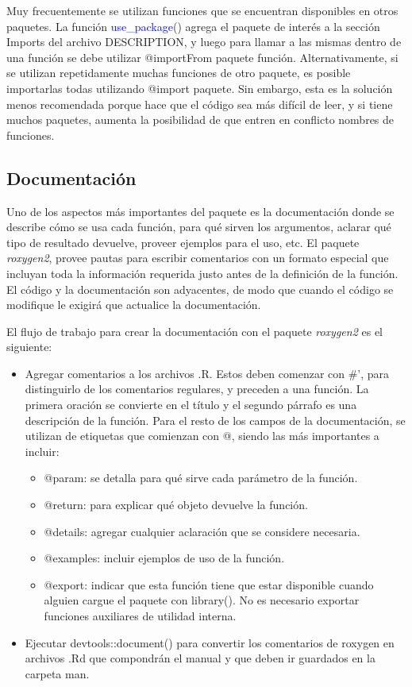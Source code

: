 Muy frecuentemente se utilizan funciones que se encuentran disponibles en otros paquetes. La función \textcolor{blue}{use\_package}() agrega el paquete de interés a la sección Imports del archivo DESCRIPTION, y luego para llamar a las mismas dentro de una función se debe utilizar @importFrom paquete función. Alternativamente, si se utilizan repetidamente muchas funciones de otro paquete, es posible importarlas todas utilizando @import paquete. Sin embargo, esta es la solución menos recomendada porque hace que el código sea más difícil de leer, y si tiene muchos paquetes, aumenta la posibilidad de que entren en conflicto nombres de funciones.


\subsection{Documentación}

Uno de los aspectos más importantes del paquete es la documentación donde se describe cómo se usa cada función, para qué sirven los argumentos, aclarar qué tipo de resultado devuelve, proveer ejemplos para el uso, etc. El paquete \emph{roxygen2}, provee pautas para escribir comentarios con un formato especial que incluyan toda la información requerida justo antes de la definición de la función. El código y la documentación son adyacentes, de modo que cuando el código se modifique le exigirá que actualice la documentación. 

El flujo de trabajo para crear la documentación con el paquete \emph{roxygen2} es el siguiente:

\begin{itemize}
\item Agregar comentarios a los archivos .R. Estos deben comenzar con \#', para distinguirlo de los comentarios regulares, y preceden a una función. La primera oración se convierte en el título y el segundo párrafo es una descripción de la función. Para el resto de los campos de la documentación, se utilizan de etiquetas que comienzan con @, siendo las más importantes a incluir:

\begin{itemize}
\item @param: se detalla para qué sirve cada parámetro de la función.
\item @return: para explicar qué objeto devuelve la función.
\item @details: agregar cualquier aclaración que se considere necesaria.
\item @examples: incluir ejemplos de uso de la función.
\item @export: indicar que esta función tiene que estar disponible cuando alguien cargue el paquete con library(). No es necesario exportar funciones auxiliares de utilidad interna.
\end{itemize}

\item Ejecutar devtools::document() para convertir los comentarios de roxygen en archivos .Rd que compondrán el manual y que deben ir guardados en la carpeta man.
\end{itemize}


